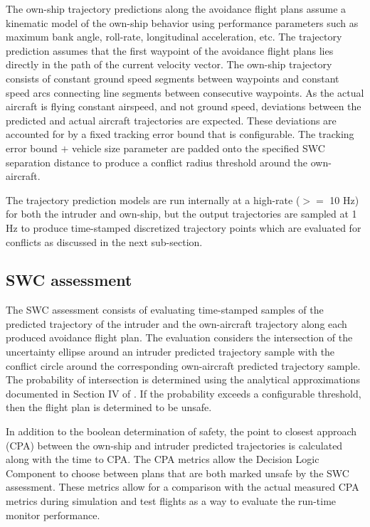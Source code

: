 The own-ship trajectory predictions along the avoidance flight plans assume a kinematic model of the own-ship behavior using performance parameters such as maximum bank angle, roll-rate, longitudinal acceleration, etc. The trajectory prediction assumes that the first waypoint of the avoidance flight plans lies directly in the path of the current velocity vector. The own-ship trajectory consists of constant ground speed segments between waypoints and constant speed arcs connecting line segments between consecutive waypoints. As the actual aircraft is flying constant airspeed, and not ground speed, deviations between the predicted and actual aircraft trajectories are expected. These deviations are accounted for by a fixed tracking error bound that is configurable. The tracking error bound $+$ vehicle size parameter are padded onto the specified SWC separation distance to produce a conflict radius threshold around the own-aircraft.

The trajectory prediction models are run internally at a high-rate ($>= $ 10 Hz) for both the intruder and own-ship, but the output trajectories are sampled at 1 Hz to produce time-stamped discretized trajectory points which are evaluated for conflicts as discussed in the next sub-section.

\subsection{SWC assessment} 
The SWC assessment consists of evaluating time-stamped samples of the predicted trajectory of the intruder and the own-aircraft trajectory along each produced avoidance flight plan. The evaluation considers the intersection of the uncertainty ellipse around an intruder predicted trajectory sample with the conflict circle around the corresponding own-aircraft predicted trajectory sample. The probability of intersection is determined using the analytical approximations documented in Section IV of \cite{prob_conflict_detection}. If the probability exceeds a configurable threshold, then the flight plan is determined to be unsafe. 

In addition to the boolean determination of safety, the point to closest approach (CPA) between the own-ship and intruder predicted trajectories is calculated along with the time to CPA. The CPA metrics allow the Decision Logic Component to choose between plans that are both marked unsafe by the SWC assessment. These metrics allow for a comparison with the actual measured CPA metrics during simulation and test flights as a way to evaluate the run-time monitor performance.
